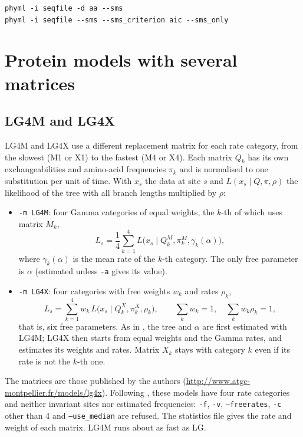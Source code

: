 \documentclass[a4paper,12pt]{article}
\newcommand{\x}[1]{\texttt{#1}}
\begin{document}
\begin{verbatim}
phyml -i seqfile -d aa --sms
phyml -i seqfile --sms --sms_criterion aic --sms_only
\end{verbatim}

\section{Protein models with several matrices}\label{sec:multimatrix}

\subsection{LG4M and LG4X}\label{sec:lg4}

LG4M and LG4X \cite{lg4x} use a different replacement matrix for each rate category, from the
slowest (M1 or X1) to the fastest (M4 or X4). Each matrix $Q_k$ has its own exchangeabilities and
amino-acid frequencies $\pi_k$ and is normalised to one substitution per unit of time. With $x_s$
the data at site $s$ and $L(x_s \mid Q, \pi, \rho)$ the likelihood of the tree with all branch
lengths multiplied by $\rho$:
\begin{itemize}
\item \x{-m LG4M}: four Gamma categories of equal weights, the $k$-th of which uses matrix $M_k$,
\[ L_s = \frac{1}{4}\sum_{k=1}^{4} L\big(x_s \mid Q^{M}_k, \pi^{M}_k, \gamma_k(\alpha)\big), \]
  where $\gamma_k(\alpha)$ is the mean rate of the $k$-th category. The only free parameter is
  $\alpha$ (estimated unless \x{-a} gives its value).
\item \x{-m LG4X}: four categories with free weights $w_k$ and rates $\rho_k$,
\[ L_s = \sum_{k=1}^{4} w_k\, L\big(x_s \mid Q^{X}_k, \pi^{X}_k, \rho_k\big), \qquad \sum_k w_k = 1,
\quad \sum_k w_k \rho_k = 1, \]
  that is, six free parameters. As in \cite{lg4x}, the tree and $\alpha$ are first estimated with
  LG4M; LG4X then starts from equal weights and the Gamma rates, and estimates its weights and
  rates. Matrix $X_k$ stays with category $k$ even if its rate is not the $k$-th one.
\end{itemize}
The matrices are those published by the authors (\url{http://www.atgc-montpellier.fr/models/lg4x}).
Following \cite{lg4x}, these models have four rate categories and neither invariant sites nor
estimated frequencies: \x{-f}, \x{-v}, \x{--freerates}, \x{-c} other than 4 and \x{--use\_median} are
refused. The statistics file gives the rate and weight of each matrix. LG4M runs about as fast as LG.
\end{document}
